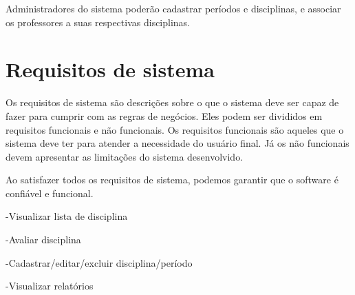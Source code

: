 Administradores do sistema poderão cadastrar períodos e disciplinas, e associar os professores a suas respectivas disciplinas. 

\section{Requisitos de sistema}
Os requisitos de sistema são descrições sobre o que o sistema deve ser capaz de fazer para cumprir com as regras de negócios. Eles podem ser divididos em requisitos funcionais e não funcionais. Os requisitos funcionais são aqueles que o sistema deve ter para atender a necessidade do usuário final. Já os não funcionais devem apresentar as limitações do sistema desenvolvido.

Ao satisfazer todos os requisitos de sistema, podemos garantir que o software é confiável e funcional. 

-Visualizar lista de disciplina

-Avaliar disciplina

-Cadastrar/editar/excluir disciplina/período

-Visualizar relatórios

